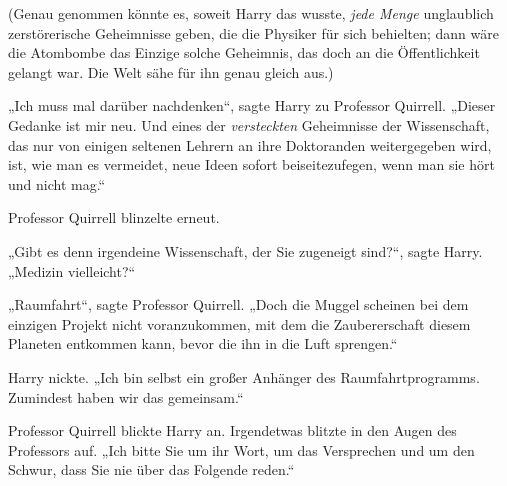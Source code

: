 (Genau genommen könnte es, soweit Harry das wusste, \emph{jede Menge} unglaublich zerstörerische Geheimnisse geben, die die Physiker für sich behielten; dann wäre die Atombombe das Einzige solche Geheimnis, das doch an die Öffentlichkeit gelangt war. Die Welt sähe für ihn genau gleich aus.)

„Ich muss mal darüber nachdenken“, sagte Harry zu Professor Quirrell. „Dieser Gedanke ist mir neu. Und eines der \emph{versteckten} Geheimnisse der Wissenschaft, das nur von einigen seltenen Lehrern an ihre Doktoranden weitergegeben wird, ist, wie man es vermeidet, neue Ideen sofort beiseitezufegen, wenn man sie hört und nicht mag.“

Professor Quirrell blinzelte erneut.

„Gibt es denn irgendeine Wissenschaft, der Sie zugeneigt sind?“, sagte Harry. „Medizin vielleicht?“

„Raumfahrt“, sagte Professor Quirrell. „Doch die Muggel scheinen bei dem einzigen Projekt nicht voranzukommen, mit dem die Zaubererschaft diesem Planeten entkommen kann, bevor die ihn in die Luft sprengen.“

Harry nickte. „Ich bin selbst ein großer Anhänger des Raumfahrtprogramms. Zumindest haben wir das gemeinsam.“

Professor Quirrell blickte Harry an. Irgendetwas blitzte in den Augen des Professors auf. „Ich bitte Sie um ihr Wort, um das Versprechen und um den Schwur, dass Sie nie über das Folgende reden.“

